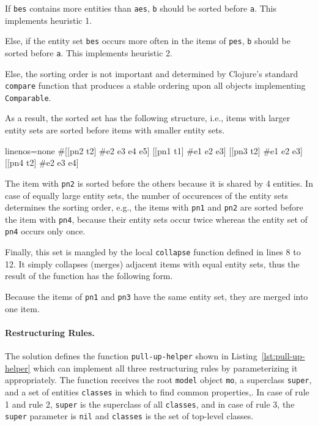 \documentclass[submission]{eptcs}
\begin{document}
\begin{compactenum}
\item If \verb|bes| contains more entities than \verb|aes|, \verb|b| should be
  sorted before \verb|a|.  This implements heuristic 1.
\item Else, if the entity set \verb|bes| occurs more often in the items of
  \verb|pes|, \verb|b| should be sorted before \verb|a|.  This implements
  heuristic 2.
\item Else, the sorting order is not important and determined by Clojure's
  standard \verb|compare| function that produces a stable ordering upon all
  objects implementing \verb|Comparable|.
\end{compactenum}

As a result, the sorted set has the following structure, i.e., items with
larger entity sets are sorted before items with smaller entity sets.

\begin{clojurecode*}{linenos=none}
#{[[pn2 t2] #{e2 e3 e4 e5}]  [[pn1 t1] #{e1 e2 e3}]
  [[pn3 t2] #{e1 e2 e3}]     [[pn4 t2] #{e2 e3 e4}]}
\end{clojurecode*}

The item with \verb|pn2| is sorted before the others because it is shared by 4
entities.  In case of equally large entity sets, the number of occurences of
the entity sets determines the sorting order, e.g., the items with \verb|pn1|
and \verb|pn2| are sorted before the item with \verb|pn4|, because their entity
sets occur twice whereas the entity set of \verb|pn4| occurs only once.

Finally, this set is mangled by the local \verb|collapse| function defined in
lines 8 to 12.  It simply collapses (merges) adjacent items with equal entity
sets, thus the result of the function has the following form.

\begin{clojurecode*}{linenos=none}
([([pn2 t2])          #{e2 e3 e4 e5}]
 [([pn1 t1] [pn3 t2]) #{e1 e2 e3}]
 [([pn4 t2])          #{e2 e3 e4}]}
\end{clojurecode*}

Because the items of \verb|pn1| and \verb|pn3| have the same entity set, they
are merged into one item.


\paragraph{Restructuring Rules.}

The solution defines the function \verb|pull-up-helper| shown in
Listing~\ref{lst:pull-up-helper} which can implement all three restructuring
rules by parameterizing it appropriately.  The function receives the root
\verb|model| object \verb|mo|, a superclass \verb|super|, and a set of entities
\verb|classes| in which to find common properties,.  In case of rule 1 and rule
2, \verb|super| is the superclass of all \verb|classes|, and in case of rule 3,
the \verb|super| parameter is \verb|nil| and \verb|classes| is the set of
top-level classes.
\end{document}

